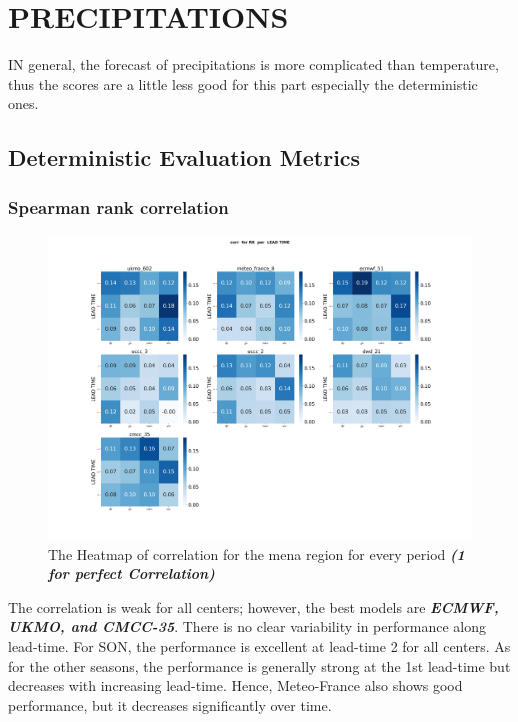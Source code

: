 \section{PRECIPITATIONS}
IN general, the forecast of precipitations is more complicated than temperature, thus the scores are a little less good for this part especially the deterministic ones. 
\subsection{Deterministic Evaluation Metrics}

\subsubsection{Spearman rank correlation}

\begin{figure}[H]
	\centering
	\includegraphics[scale=0.25]{plots/det/corr/corr_RR_mena.png}
	\caption{The Heatmap of correlation for the mena region for every period \textbf{\textit{(1 for perfect Correlation)} }}
\end{figure}
The correlation is weak for all centers; however, the best models are \textbf{\textit{ECMWF, UKMO, and CMCC-35}}. There is no clear variability in performance along lead-time. For SON, the performance is excellent at lead-time 2 for all centers. As for the other seasons, the performance is generally strong at the 1st lead-time but decreases with increasing lead-time.
Hence, Meteo-France also shows good performance, but it decreases significantly over time.




